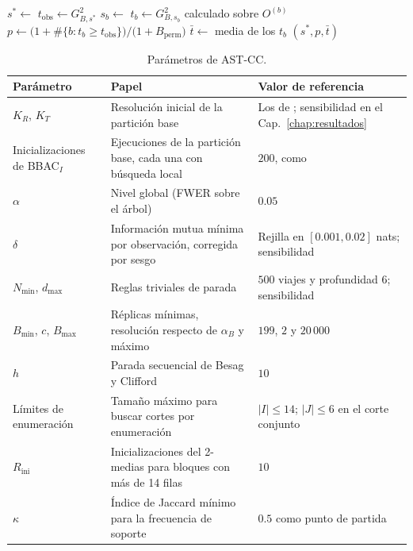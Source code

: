 \begin{algorithm}[t]
\caption{Selección del mejor corte con ajuste \emph{min-P}}\label{alg:mejorcorte}
\begin{algorithmic}[1]
  \State $s^\ast\gets$  
  \State $t_{\mathrm{obs}}\gets G^2_{B,s^\ast}$
    \State $s_b\gets$  
    \State $t_b\gets G^2_{B,s_b}$ calculado sobre $O^{(b)}$
  \EndFor
  \State $p\gets \bigl(1+\#\{b: t_b\ge t_{\mathrm{obs}}\}\bigr)/\bigl(1+B_{\mathrm{perm}}\bigr)$
  \State $\bar t\gets$ media de los $t_b$ 
  \State \Return $(s^\ast, p, \bar t)$
\EndFunction
\end{algorithmic}
\end{algorithm}

\begin{table}[t]
\centering
\small
\begin{tabular}{>{\raggedright\arraybackslash}p{}>{\raggedright\arraybackslash}p{}>{\raggedright\arraybackslash}p{}}
\toprule
Parámetro & Papel & Valor de referencia \\
\midrule
$K_R$, $K_T$ & Resolución inicial de la partición base & Los de \cite{Liu2021}; sensibilidad en el Cap.~\ref{chap:resultados} \\
Inicializaciones de BBAC$_I$ & Ejecuciones de la partición base, cada una con búsqueda local & $200$, como \cite{Liu2021} \\
$\alpha$ & Nivel global (FWER sobre el árbol) & $0.05$ \\
$\delta$ & Información mutua mínima por observación, corregida por sesgo & Rejilla en $[0.001, 0.02]$ nats; sensibilidad \\
$N_{\min}$, $d_{\max}$ & Reglas triviales de parada & $500$ viajes y profundidad $6$; sensibilidad \\
$B_{\min}$, $c$, $B_{\max}$ & Réplicas mínimas, resolución respecto de $\alpha_B$ y máximo & $199$, $2$ y $20\,000$ \\
$h$ & Parada secuencial de Besag y Clifford & $10$ \\
Límites de enumeración & Tamaño máximo para buscar cortes por enumeración & $|I|\le14$; $|J|\le6$ en el corte conjunto \\
$R_{\mathrm{ini}}$ & Inicializaciones del 2-medias para bloques con más de 14 filas & $10$ \\
$\kappa$ & Índice de Jaccard mínimo para la frecuencia de soporte & $0.5$ como punto de partida \\
\bottomrule
\end{tabular}
\caption{Parámetros de AST-CC.}
\label{tab:prop-parametros}
\end{table}

